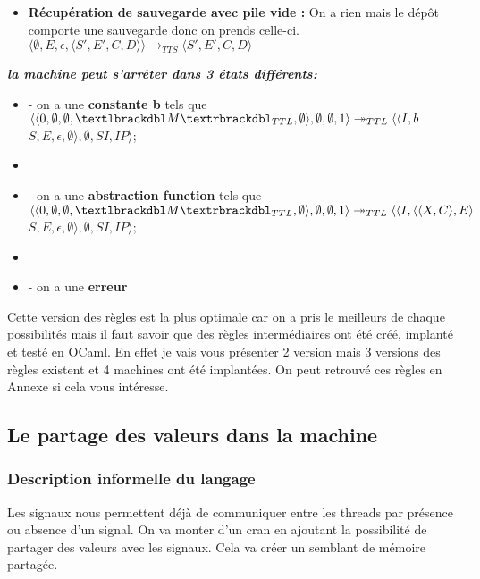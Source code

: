 \documentclass[10pt,a4paper]{article}
\begin{document}
\begin{enumerate}
\begin{itemize}
				        \item[] \textbf{Récupération de sauvegarde avec pile vide :}  On a rien mais le dépôt comporte une sauvegarde donc on prends celle-ci.
						\smallbreak  
						$\langle \emptyset,E,\epsilon,\langle S',E',C,D\rangle\rangle
						\longrightarrow_{TTS} 
						\langle S',E',C,D\rangle$
					\end{itemize}
				\end{enumerate}
				\bigbreak
				\bigbreak
					
					
				\textbf{\textit{la machine peut s'arrêter dans 3 états différents:}}
				\smallbreak
				\begin{itemize}
					\item[] - on a une \textbf{constante b} tels que 
					$\langle\langle 0,\emptyset,\emptyset,\textlbrackdbl M\textrbrackdbl_{TTL},\emptyset\rangle,\emptyset,\emptyset,1\rangle 
					\twoheadrightarrow_{TTL} 
					\langle\langle I,b$ $S,E,\epsilon,\emptyset\rangle,\emptyset,SI,IP\rangle$;
					\item[] 
				    
				    \item[] - on a une \textbf{abstraction function} tels que
					$\langle\langle 0,\emptyset,\emptyset,\textlbrackdbl M\textrbrackdbl_{TTL},\emptyset\rangle,\emptyset,\emptyset,1\rangle 
					\twoheadrightarrow_{TTL} 
					\langle\langle I,\langle\langle X,C\rangle,E\rangle$ $S,E,\epsilon,\emptyset\rangle,\emptyset,SI,IP\rangle$;
					\item[] 
			
					\item[] - on a une \textbf{erreur} 
				\end{itemize}
				\bigbreak
				\bigbreak
					
					
					
					
				Cette version des règles est la plus optimale car on a pris le meilleurs de chaque possibilités mais il faut savoir que des règles intermédiaires ont été créé, implanté et testé en OCaml. En effet je vais vous présenter 2 version mais 3 versions des règles existent et 4 machines ont été implantées. On peut retrouvé ces règles en Annexe si cela vous intéresse.
				\newpage
					
					
		\subsection{Le partage des valeurs dans la machine}
			
			\subsubsection{Description informelle du langage}
				Les signaux nous permettent déjà de communiquer entre les threads par présence ou absence d'un signal. On va monter d'un cran en ajoutant la possibilité de partager des valeurs avec les signaux. Cela va créer un semblant de mémoire partagée.
				\medbreak
				
\end{document}

